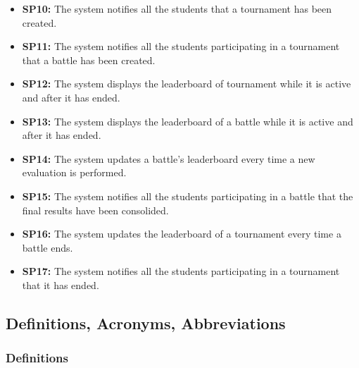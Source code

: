 \documentclass{article}
\begin{document}
\begin{itemize}
    \item \textbf{SP10:} The system notifies all the students that a tournament has been created.
    \item \textbf{SP11:} The system notifies all the students participating in a tournament that a battle has been created.
    \item \textbf{SP12:} The system displays the leaderboard of tournament while it is active and after it has ended.
    \item \textbf{SP13:} The system displays the leaderboard of a battle while it is active and after it has ended.
    \item \textbf{SP14:} The system updates a battle's leaderboard every time a new evaluation is performed.
    \item \textbf{SP15:} The system notifies all the students participating in a battle that the final results have been consolided.
    \item \textbf{SP16:} The system updates the leaderboard of a tournament every time a battle ends.
    \item \textbf{SP17:} The system notifies all the students participating in a tournament that it has ended.
\end{itemize}

\newpage

\subsection{Definitions, Acronyms, Abbreviations}

\subsubsection{Definitions}
 
\end{document}
